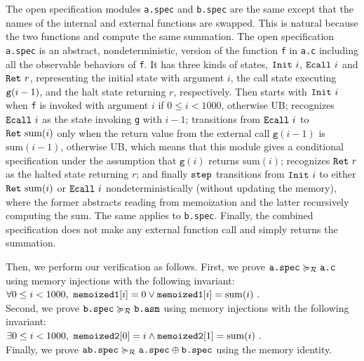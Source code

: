 The open specification modules \texttt{a.spec} and \texttt{b.spec} are
the same except that the names of the internal and external functions
are swapped. This is natural because the two functions  and
 compute the same summation. The open specification
\texttt{a.spec} is an abstract, nondeterministic, version of the
function \texttt{f} in \texttt{a.c} including all the observable
behaviors of \texttt{f}.  It has three kinds of states,
$\texttt{Init}~i$, $\texttt{Ecall}~i$ and $\texttt{Ret}~r$, representing the
initial state with argument $i$, the call state executing
$\texttt{g}(i-1)$, and the halt state returning $r$, respectively. Then
 starts with $\texttt{Init}~i$ when \texttt{f} is
invoked with argument $i$ if $0 \le i < 1000$, otherwise UB;
 recognizes $\texttt{Ecall}~i$ as the state invoking
\texttt{g} with $i-1$;  transitions
from $\texttt{Ecall}~i$ to $\texttt{Ret}~\mathrm{sum}(i)$ only
when the return value from the external call $\texttt{g}(i-1)$
is $\mathrm{sum}(i-1)$, otherwise UB, which
means that this module gives a conditional specification under the
assumption that $\texttt{g}(i)$ returns $\mathrm{sum}(i)$;
 recognizes $\texttt{Ret}~r$ as the halted state returning
$r$; and finally $\texttt{step}$ transitions from $\texttt{Init}~i$ to
either $\texttt{Ret}~\mathrm{sum}(i)$ or $\texttt{Ecall}~i$
nondeterministically (without updating the memory), where the former
abstracts reading from memoization and the latter recursively
computing the sum. The same applies to \texttt{b.spec}.
Finally, the combined specification  does not make any
external function call and simply returns the summation.

Then, we perform our verification as follows.
First, we prove $\texttt{a.spec} \succcurlyeq_{\mathcal{R}} \texttt{a.c}$
using memory injections with the following invariant:\\
\mbox{}\hfill$\forall 0 \le i < 1000,~
\texttt{memoized1}[i] = 0 \lor \texttt{memoized1}[i] = \mathrm{sum}(i)~.$\hfill\mbox{}
\\
Second, we prove $\texttt{b.spec} \succcurlyeq_{\mathcal{R}} \texttt{b.asm}$
using memory injections with the following invariant:\\
\mbox{}\hfill$
\exists 0 \le i < 1000,~
\texttt{memoized2}[0] = i \land \texttt{memoized2}[1] = \mathrm{sum}(i)~.
$\hfill\mbox{}
\\
Finally, we prove $\texttt{ab.spec} \succcurlyeq_{\mathcal{R}} \texttt{a.spec} \oplus
\texttt{b.spec}$ using the memory identity.

